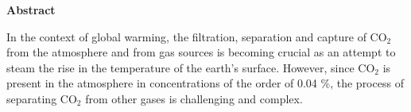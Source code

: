 \begin{center}
	\textbf{\Large{Abstract}}
\end{center}

\vspace{0.5cm}

\justifying

In the context of global warming, the filtration, separation and capture of CO$_2$ from the atmosphere and from gas sources is becoming crucial as an attempt to steam the rise in the temperature of the earth's surface. However, since CO$_2$ is present in the atmosphere in concentrations of the order of 0.04 \%, the process of separating CO$_2$ from other gases is challenging and complex. 

\vspace{3cm}

\clearpage